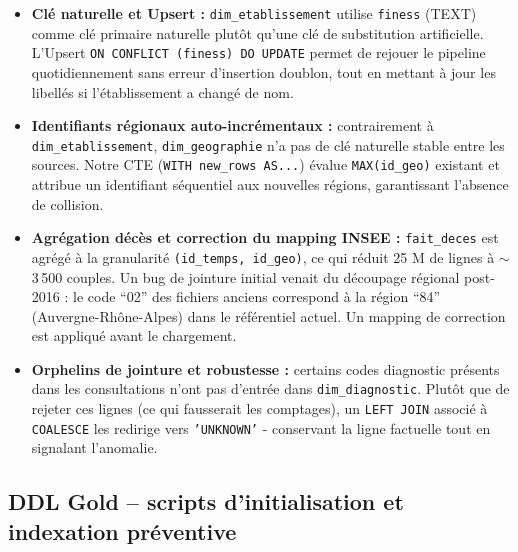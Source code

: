 \documentclass[12pt,a4paper]{report}
\begin{document}
\begin{itemize}
    \item \textbf{Clé naturelle et Upsert :} \texttt{dim\_etablissement} utilise \texttt{finess} (TEXT) comme clé primaire naturelle plutôt qu'une clé de substitution artificielle. L'Upsert \texttt{ON CONFLICT (finess) DO UPDATE} permet de rejouer le pipeline quotidiennement sans erreur d'insertion doublon, tout en mettant à jour les libellés si l'établissement a changé de nom.
    \item \textbf{Identifiants régionaux auto-incrémentaux :} contrairement à \texttt{dim\_\allowbreak etablissement}, \texttt{dim\_geographie} n'a pas de clé naturelle stable entre les sources. Notre CTE (\texttt{WITH new\_rows AS...}) évalue \texttt{MAX(id\_geo)} existant et attribue un identifiant séquentiel aux nouvelles régions, garantissant l'absence de collision.
    \item \textbf{Agrégation décès et correction du mapping INSEE :} \texttt{fait\_deces} est agrégé à la granularité \texttt{(id\_temps, id\_geo)}, ce qui réduit 25 M de lignes à $\sim$3\,500 couples. Un bug de jointure initial venait du découpage régional post-2016 : le code ``02'' des fichiers anciens correspond à la région ``84'' (Auvergne-Rhône-Alpes) dans le référentiel actuel. Un mapping de correction est appliqué avant le chargement.
    \item \textbf{Orphelins de jointure et robustesse :} certains codes diagnostic présents dans les consultations n'ont pas d'entrée dans \texttt{dim\_diagnostic}. Plutôt que de rejeter ces lignes (ce qui fausserait les comptages), un \texttt{LEFT JOIN} associé à \texttt{COALESCE} les redirige vers \texttt{'UNKNOWN'} - conservant la ligne factuelle tout en signalant l'anomalie.
\end{itemize}

\subsection{DDL Gold -- scripts d'initialisation et indexation préventive}
\end{document}
